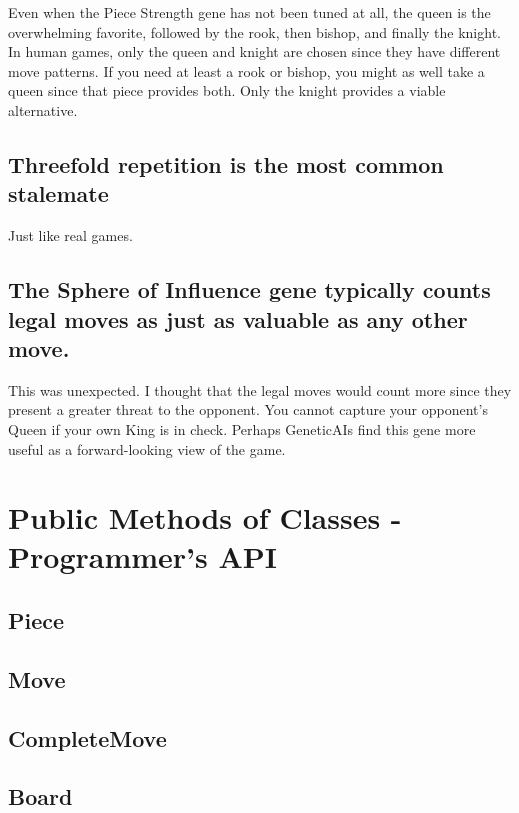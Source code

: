 \documentclass[letter]{article}
\renewcommand\_{\textunderscore\allowbreak}
\begin{document}
Even when the Piece Strength gene has not been tuned at all, the queen is the overwhelming favorite, followed by the rook, then bishop, and finally the knight. In human games, only the queen and knight are chosen since they have different move patterns. If you need at least a rook or bishop, you might as well take a queen since that piece provides both. Only the knight provides a viable alternative. 


\subsection*{Threefold repetition is the most common stalemate}

Just like real games.


\subsection*{The Sphere of Influence gene typically counts legal moves as just as valuable as any other move.}

This was unexpected. I thought that the legal moves would count more since they present a greater threat to the opponent. You cannot capture your opponent's Queen if your own King is in check. Perhaps Genetic\_AIs find this gene more useful as a forward-looking view of the game.


\section{Public Methods of Classes - Programmer's API}

\subsection{Piece}

\subsection{Move}

\subsection{Complete\_Move}

\subsection{Board}
\end{document}
